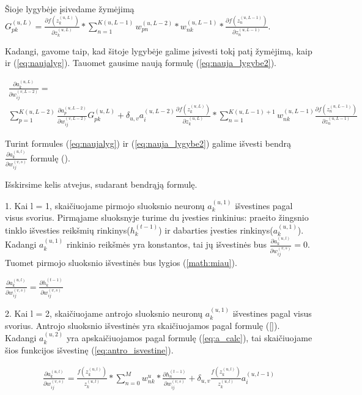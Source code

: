Šioje lygybėje įsivedame žymėjimą $G_{pk}^{(u,L)} =
\frac{\partial f(z_k^{(u, L)})}{\partial z_k^{(u,L)}}
*
\sum_{n=1}^{K(u, L-1)} w_{pn}^{(u,L-2)} * w_{nk}^{(u,L-1)} * \frac{\partial f(z_n^{(u, L-1)})}{\partial z_n^{(u,L-1)}}$.

Kadangi, gavome taip, kad šitoje lygybėje galime įsivesti tokį patį žymėjimą, kaip ir (\ref{eq:naujalyg}). Tauomet gausime naują formulę (\ref{eq:nauja_lygybe2}).


\begin{equation}\label{eq:nauja_lygybe2}
  \begin{aligned}
    \frac{\partial a_k^{(u, L)}}{\partial w_{ij}^{(v,L-2)}} = \\
    \sum_{p=1}^{K(u,L-2)}
    \frac{\partial a_p^{(u,L-2)}}{\partial w_{ij}^{(v,L-2)}}G_{pk}^{(u,L)} +    \delta_{u,v}a_i^{(u,L-2)}\frac{\partial f(z_k^{(u,L)})}{\partial z_k^{(u,L)}}*
      \sum_{n=1}^{K(u,L-1)+1} w_{nk}^{(u,L-1)} \frac{\partial f(z_n^{(u,L-1)})}{\partial z_n^{(u,L-1)}}
  \end{aligned}
\end{equation}

Turint formules (\ref{eq:naujalyg}) ir (\ref{eq:nauja_lygybe2}) galime išvesti bendrą $\frac{\partial a_k^{(u, l)}}{\partial w_{ij}^{(v,s)}}$ formulę ().

Išskirsime kelis atvejus, sudarant bendrąją formulę.

1. Kai l = 1, skaičiuojame pirmojo sluoksnio neuronų $a_k^{(u,1)}$ išvestines pagal visus svorius. Pirmąjame sluoksnyje turime du įvesties rinkinius: praeito žingsnio tinklo išvesties reikšmių rinkinys($h_k^{(t-1)}$) ir dabarties įvesties rinkinys($a_k^{(u,1)}$). Kadangi $a_k^{(u,1)}$ rinkinio reikšmės yra konstantos, tai jų išvestinės bus $\frac{\partial a_k^{(u, l)}}{\partial w_{ij}^{(v,s)}} =0$. Tuomet pirmojo sluoksnio išvestinės bus lygios (\ref{math:miau}).

$\label{math:miau}
  \frac{\partial a_k^{(u, l)}}{\partial w_{ij}^{(v,s)}} = \frac{\partial h_k^{(t-1)}}{\partial w_{ij}^{(v,s)}}
$

2. Kai l = 2, skaičiuojame antrojo sluoksnio neuronų $a_k^{(u,1)}$ išvestines pagal visus svorius. Antrojo sluoksnio išvestinės yra skaičiuojamos pagal formulę (\ref{}).
Kadangi $a_k^{(u,2)}$ yra apskaičiuojamos pagal formulę (\ref{eq:a_calc}), tai skaičiuojame šios funkcijos išvestinę (\ref{eq:antro_isvestine}).

\begin{equation}\label{eq:antro_isvestine}
  \begin{aligned}
    \frac{\partial a_k^{(u, l)}}{\partial w_{ij}^{(v,s)}} = \frac{f(z_k^{(u,l)})}{z_k^{(u,l)}}
    *
    \sum_{n=0}^M w_{nk}^u * \frac{\partial h_n^{(t-1)}}{\partial w_{ij}^{(v,s)}} +
    \delta_{u,v}\frac{f(z_k^{(u,l)})}{z_k^{(u,l)}}a_i^{(u,l-1)}
  \end{aligned}
\end{equation}

